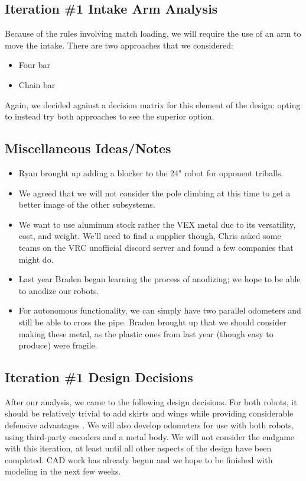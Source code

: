 \subsection{Iteration \#1 Intake Arm Analysis}
Because of the rules involving match loading, we will require the use of an arm
to move the intake. There are two approaches that we considered:
\begin{itemize}
      \item Four bar
      \item Chain bar
\end{itemize}
Again, we decided against a decision matrix for this element of the design;
opting to instead try both approaches to see the superior option.

\subsection{Miscellaneous Ideas/Notes}
\begin{itemize}
      \item Ryan brought up adding a blocker to the 24" robot for opponent
            triballs.
      \item We agreed that we will not consider the pole climbing at this time
            to get a better image of the other subsystems.
      \item We want to use aluminum stock rather the VEX metal due to its
            versatility, cost, and weight. We'll need to find a supplier though,
            Chris asked some teams on the VRC unofficial discord server and
            found a few companies that might do.
      \item Last year Braden began learning the process of anodizing; we hope to
            be able to anodize our robots.
      \item For autonomous functionality, we can simply have two parallel
            odometers and still be able to cross the pipe. Braden brought up
            that we should consider making these metal, as the plastic ones from
            last year (though easy to produce) were fragile.
\end{itemize}

\subsection{Iteration \#1 Design Decisions}
After our analysis, we came to the following design decisions. For both robots,
it should be relatively trivial to add skirts and wings while providing
considerable defensive advantages \cite{bib:blrswikidefense}. We will also
develop odometers for use with both robots, using third-party encoders and a
metal body. We will not consider the endgame with this iteration, at least until
all other aspects of the design have been completed. CAD work has already begun
and we hope to be finished with modeling in the next few weeks.
